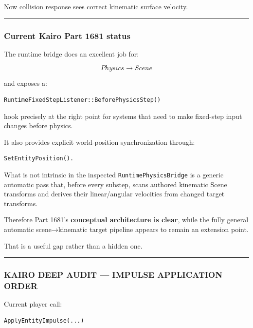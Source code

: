 Now collision response sees correct kinematic surface velocity.

\begin{center}\rule{0.5\linewidth}{0.5pt}\end{center}

\subsubsection{Current Kairo Part 1681 status}\label{current-kairo-part-1681-status}

The runtime bridge does an excellent job for:

\[
Physics\rightarrow Scene
\]

and exposes a:

\begin{verbatim}
RuntimeFixedStepListener::BeforePhysicsStep()
\end{verbatim}

hook precisely at the right point for systems that need to make fixed-step input changes before physics.

It also provides explicit world-position synchronization through:

\begin{verbatim}
SetEntityPosition().
\end{verbatim}

What is not intrinsic in the inspected \texttt{RuntimePhysicsBridge} is a generic automatic pass that, before every substep, scans authored kinematic Scene transforms and derives their linear/angular velocities from changed target transforms.

Therefore Part 1681's \textbf{conceptual architecture is clear}, while the fully general automatic scene→kinematic target pipeline appears to remain an extension point.

That is a useful gap rather than a hidden one.

\begin{center}\rule{0.5\linewidth}{0.5pt}\end{center}

\subsubsection{KAIRO DEEP AUDIT --- IMPULSE APPLICATION ORDER}\label{kairo-deep-audit-impulse-application-order}

Current player call:

\begin{verbatim}
ApplyEntityImpulse(...)
\end{verbatim}

